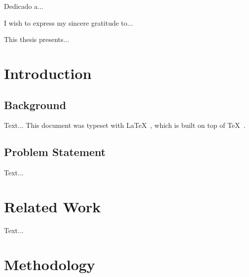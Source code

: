 \documentclass[12pt]{report}
\begin{document}

\portada



\tableofcontents
\listoffigures  %
\listoftables   %

\begin{dedicatoria}
  Dedicado a...
\end{dedicatoria}

\begin{agradecimientos}
  I wish to express my sincere gratitude to...
\end{agradecimientos}

\begin{resumen}
  This thesis presents...
\end{resumen}


\clearpage
{}

\chapter{Introduction}

\section{Background}

Text... This document was typeset with \LaTeX~\cite{lamport94}, which is
built on top of \TeX~\cite{knuth84}.

\section{Problem Statement}

Text...

\chapter{Related Work}

Text...

\chapter{Methodology}
\end{document}
